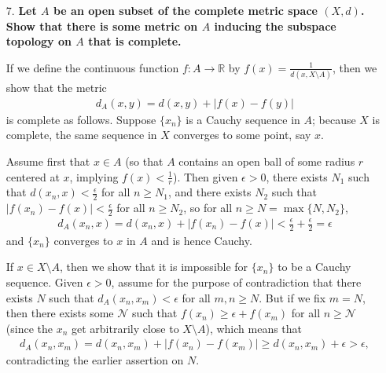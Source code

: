 \documentclass[a4paper,12pt]{article}
\begin{document}
\begin{enumerate}
    \item[7.]
        \boldmath\textbf{Let $A$ be an open subset of the complete metric space $(X, d)$. Show that there is some metric on $A$ inducing the subspace topology on $A$ that is complete.
        }\unboldmath \par
        If we define the continuous function $f : A \to \mathbb{R}$ by $f(x) = \frac{1}{d(x, X \setminus A)}$, then we show that the metric
        \begin{align*}
            d_A(x, y) = d(x, y) + |f(x) - f(y)|
        \end{align*}
        is complete as follows. Suppose $\{x_n\}$ is a Cauchy sequence in $A$; because $X$ is complete, the same sequence in $X$ converges to some point, say $x$. \par
        Assume first that $x \in A$ (so that $A$ contains an open ball of some radius $r$ centered at $x$, implying $f(x) < \frac{1}{r}$). Then given $\epsilon > 0$, there exists $N_1$ such that $d(x_n, x) < \frac{\epsilon}{2}$ for all $n \geq N_1$, and there exists $N_2$ such that $|f(x_n) - f(x)| < \frac{\epsilon}{2}$ for all $n \geq N_2$, so for all $n \geq N = \max\{N, N_2\}$,
        \begin{align*}
            d_A(x_n, x) = d(x_n, x) + |f(x_n) - f(x)| < \frac{\epsilon}{2} + \frac{\epsilon}{2} = \epsilon
        \end{align*}
        and $\{x_n\}$ converges to $x$ in $A$ and is hence Cauchy. \par
        If $x \in X \setminus A$, then we show that it is impossible for $\{x_n\}$ to be a Cauchy sequence. Given $\epsilon > 0$, assume for the purpose of contradiction that there exists $N$ such that $d_A(x_n, x_m) < \epsilon$ for all $m, n \geq N$. But if we fix $m = N$, then there exists some $\mathcal{N}$ such that $f(x_n) \geq \epsilon + f(x_m)$ for all $n \geq \mathcal{N}$ (since the $x_n$ get arbitrarily close to $X \setminus A$), which means that
        \begin{align*}
            d_A(x_n, x_m) = d(x_n, x_m) + |f(x_n) - f(x_m)| \geq d(x_n, x_m) + \epsilon > \epsilon,
        \end{align*}
        contradicting the earlier assertion on $N$.


\end{enumerate}
\end{document}
